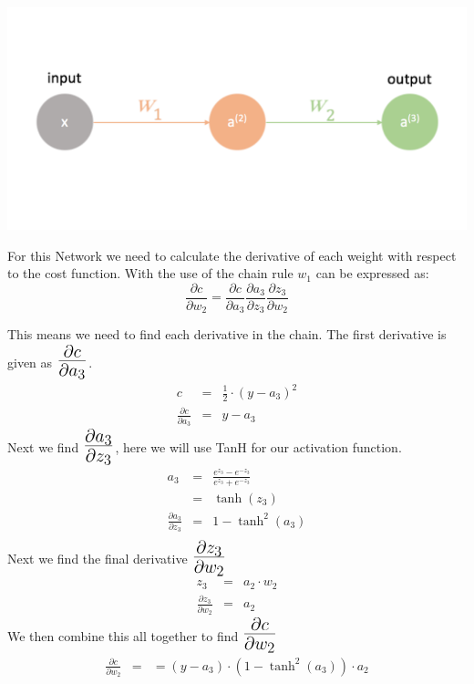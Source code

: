\begin{flushleft}
                    \centerline{\includegraphics[width=14cm]{Images/ModellingOfProblem/SingleLayerNeuralNetEdited.png}}

                    For this Network we need to calculate the derivative of each weight with respect to the cost function. With
                    the use of the chain rule $w_1$ can be expressed as: \\

                    \[\frac{\partial c}{\partial w_{2}} = \frac{\partial c}{\partial a_3} \frac{\partial a_3}{\partial z_3} \frac{\partial z_3}{\partial w_2}\]

                    This means we need to find each derivative in the chain.
                    \vspace{0.2cm}
                    The first derivative is given as $\mathLarge{\frac{\partial c}{\partial a_3}}$. 
                    \begin{eqnarray*}
                        c &=& \frac{1}{2} \cdot (y - a_3)^2 \\
                        \frac{\partial c}{\partial a_3} &=& y - a_3
                    \end{eqnarray*}
                    Next we find $\mathLarge{\frac{\partial a_3}{\partial z_3}}$, here we will use TanH for our activation function.
                    \begin{eqnarray*}
                        a_3 &=& \frac{e^{z_3} - e^{-z_3}}{e^{z_3} + e^{-z_3}} \\
                            &=& \tanh(z_3) \\
                        \frac{\partial a_3}{\partial z_3} &=& 1 - \tanh^{2}(a_3) \\
                    \end{eqnarray*}
                    Next we find the final derivative $\mathLarge{\frac{\partial z_3}{\partial w_2}}$
                    \begin{eqnarray*}
                        z_3 &=& a_2 \cdot w_2 \\
                        \frac{\partial z_3}{\partial w_2} &=& a_2
                    \end{eqnarray*}
                    We then combine this all together to find $\mathLarge{\frac{\partial c}{\partial w_{2}}}$
                    \begin{eqnarray*}
                        \frac{\partial c}{\partial w_{2}} &=& = (y - a_3) \cdot (1 - \tanh^{2}(a_3)) \cdot a_2
                    \end{eqnarray*}


\end{flushleft}
